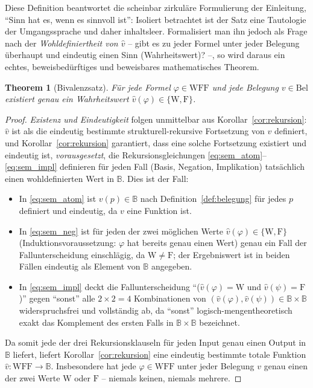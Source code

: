 \documentclass[12pt, a4paper]{article}
\newtheorem{theorem}{Theorem}[section]
\theoremstyle{definition}
\theoremstyle{remark}
\newcommand{\W}{\mathrm{W}}
\newcommand{\F}{\mathrm{F}}
\newcommand{\WFF}{\mathrm{WFF}}
\newcommand{\Bel}{\mathrm{Bel}}
\begin{document}
Diese Definition beantwortet die scheinbar zirkuläre Formulierung der Einleitung, ``Sinn hat es, wenn es sinnvoll ist'': Isoliert betrachtet ist der Satz eine Tautologie der Umgangssprache und daher inhaltsleer. Formalisiert man ihn jedoch als Frage nach der \emph{Wohldefiniertheit von $\hat v$} -- gibt es zu jeder Formel unter jeder Belegung überhaupt und eindeutig einen Sinn (Wahrheitswert)? --, so wird daraus ein echtes, beweisbedürftiges und beweisbares mathematisches Theorem.

\begin{theorem}[Bivalenzsatz]
\label{thm:bivalenzsatz}
Für jede Formel $\varphi \in \WFF$ und jede Belegung $v \in \Bel$ existiert genau ein Wahrheitswert $\hat v(\varphi) \in \{\W, \F\}$.
\end{theorem}
\begin{proof}
\emph{Existenz und Eindeutigkeit} folgen unmittelbar aus Korollar~\ref{cor:rekursion}: $\hat v$ ist als die eindeutig bestimmte strukturell-rekursive Fortsetzung von $v$ definiert, und Korollar~\ref{cor:rekursion} garantiert, dass eine solche Fortsetzung existiert und eindeutig ist, \emph{vorausgesetzt}, die Rekursionsgleichungen \eqref{eq:sem_atom}--\eqref{eq:sem_impl} definieren für jeden Fall (Basis, Negation, Implikation) tatsächlich einen wohldefinierten Wert in $\mathbb{B}$. Dies ist der Fall:
\begin{itemize}
  \item In \eqref{eq:sem_atom} ist $v(p) \in \mathbb{B}$ nach Definition~\ref{def:belegung} für jedes $p$ definiert und eindeutig, da $v$ eine Funktion ist.
  \item In \eqref{eq:sem_neg} ist für jeden der zwei möglichen Werte $\hat v(\varphi) \in \{\W,\F\}$ (Induktionsvoraussetzung: $\varphi$ hat bereits genau einen Wert) genau ein Fall der Fallunterscheidung einschlägig, da $\W \ne \F$; der Ergebniswert ist in beiden Fällen eindeutig als Element von $\mathbb{B}$ angegeben.
  \item In \eqref{eq:sem_impl} deckt die Fallunterscheidung ``($\hat v(\varphi)=\W$ und $\hat v(\psi)=\F$)'' gegen ``sonst'' alle $2\times 2 = 4$ Kombinationen von $(\hat v(\varphi), \hat v(\psi)) \in \mathbb{B}\times\mathbb{B}$ widerspruchsfrei und vollständig ab, da ``sonst'' logisch-mengentheoretisch exakt das Komplement des ersten Falls in $\mathbb{B}\times\mathbb{B}$ bezeichnet.
\end{itemize}
Da somit jede der drei Rekursionsklauseln für jeden Input genau einen Output in $\mathbb{B}$ liefert, liefert Korollar~\ref{cor:rekursion} eine eindeutig bestimmte totale Funktion $\hat v: \WFF \to \mathbb{B}$. Insbesondere hat jede $\varphi \in \WFF$ unter jeder Belegung $v$ genau einen der zwei Werte $\W$ oder $\F$ -- niemals keinen, niemals mehrere.
\end{proof}
\end{document}
